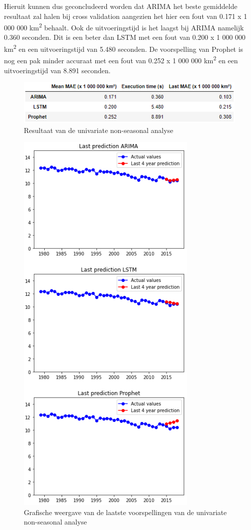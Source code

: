 Hieruit kunnen dus geconcludeerd worden dat ARIMA het beste gemiddelde resultaat zal halen bij cross validation aangezien het hier een fout van 0.171 x 1 000 000 km\textsuperscript{2} behaalt. Ook de uitvoeringstijd is het laagst bij ARIMA namelijk 0.360 seconden. Dit is een beter dan LSTM met een fout van 0.200 x 1 000 000 km\textsuperscript{2} en een uitvoeringstijd van 5.480 seconden. De voorspelling van Prophet is nog een pak minder accuraat met een fout van 0.252 x 1 000 000 km\textsuperscript{2} en een uitvoeringstijd van 8.891 seconden.


\begin{figure}
    \centering
    \caption{Resultaat van de univariate non-seasonal analyse}
    \label{fig:uvnsresult}
    \includegraphics[width=0.7\linewidth]{uv_ns_result}
\end{figure}

\begin{figure}
    \centering
    \caption{Grafische weergave van de laatste voorspellingen van de univariate non-seasonal analyse}
    \label{fig:uvnsresultgraph}
    \includegraphics[width=0.7\linewidth]{uv_ns_result_graph}
\end{figure}



